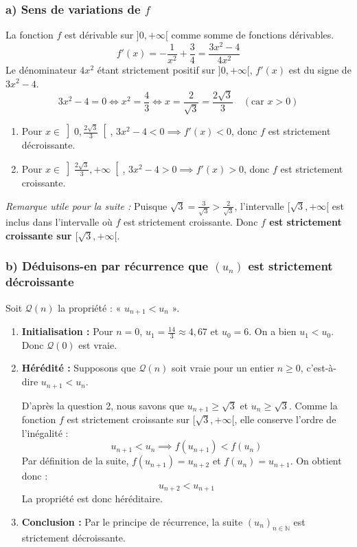 \documentclass[12pt,a4paper]{article}
\begin{document}
\subsubsection*{a) Sens de variations de $f$}
La fonction $f$ est dérivable sur $]0, +\infty[$ comme somme de fonctions dérivables.
\[ f'(x) = -\frac{1}{x^2} + \frac{3}{4} = \frac{3x^2 - 4}{4x^2} \]
Le dénominateur $4x^2$ étant strictement positif sur $]0, +\infty[$, $f'(x)$ est du signe de $3x^2 - 4$.
\[ 3x^2 - 4 = 0 \iff x^2 = \frac{4}{3} \iff x = \frac{2}{\sqrt{3}} = \frac{2\sqrt{3}}{3} \quad (\text{car } x > 0) \]
\begin{enumerate}
    \item Pour $x \in \left]0, \frac{2\sqrt{3}}{3}\right[$, $3x^2 - 4 < 0 \implies f'(x) < 0$, donc $f$ est strictement décroissante.
    \item Pour $x \in \left]\frac{2\sqrt{3}}{3}, +\infty\right[$, $3x^2 - 4 > 0 \implies f'(x) > 0$, donc $f$ est strictement croissante.

\end{enumerate}
\textit{Remarque utile pour la suite :} Puisque $\sqrt{3} = \frac{3}{\sqrt{3}} > \frac{2}{\sqrt{3}}$, l'intervalle $[\sqrt{3}, +\infty[$ est inclus dans l'intervalle où $f$ est strictement croissante. Donc \textbf{$f$ est strictement croissante sur $[\sqrt{3}, +\infty[$}.

\subsubsection*{b) Déduisons-en par récurrence que $(u_n)$ est strictement décroissante}
Soit $\mathcal{Q}(n)$ la propriété : « $u_{n+1} < u_n$ ».
\begin{enumerate}
    \item \textbf{Initialisation :} Pour $n = 0$, $u_1 = \frac{14}{3} \approx 4,67$ et $u_0 = 6$. On a bien $u_1 < u_0$. Donc $\mathcal{Q}(0)$ est vraie.
    \item \textbf{Hérédité :} Supposons que $\mathcal{Q}(n)$ soit vraie pour un entier $n \ge 0$, c'est-à-dire $u_{n+1} < u_n$.
    
    D'après la question 2, nous savons que $u_{n+1} \ge \sqrt{3}$ et $u_n \ge \sqrt{3}$. 
    Comme la fonction $f$ est strictement croissante sur $[\sqrt{3}, +\infty[$, elle conserve l'ordre de l'inégalité :
    \[ u_{n+1} < u_n \implies f(u_{n+1}) < f(u_n) \]
    Par définition de la suite, $f(u_{n+1}) = u_{n+2}$ et $f(u_n) = u_{n+1}$. On obtient donc :
    \[ u_{n+2} < u_{n+1} \]
    La propriété est donc héréditaire.
    \item \textbf{Conclusion :} Par le principe de récurrence, la suite $(u_n)_{n \in \mathbb{N}}$ est strictement décroissante.
\end{enumerate}
\end{document}
